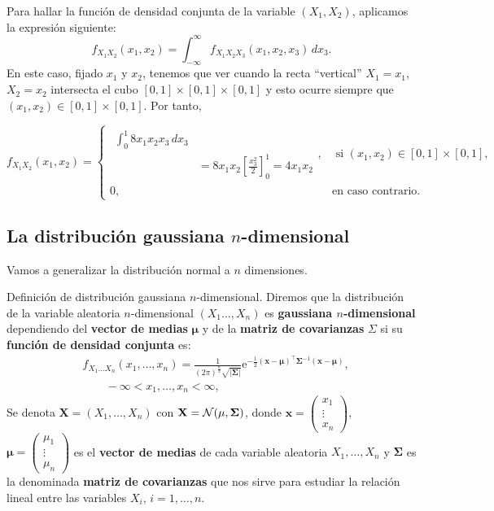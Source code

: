 \documentclass[]{book}
\begin{document}
Para hallar la función de densidad conjunta de la variable \((X_1,X_2)\), aplicamos la expresión siguiente:
\[
f_{X_1X_2}(x_1,x_2)=\int_{-\infty}^\infty  f_{X_1X_2X_3}(x_1,x_2,x_3)\, dx_3.
\]
En este caso, fijado \(x_1\) y \(x_2\), tenemos que ver cuando la recta ``vertical'' \(X_1=x_1\), \(X_2=x_2\) intersecta el cubo \([0,1]\times [0,1]\times [0,1]\) y esto ocurre siempre que \((x_1,x_2)\in [0,1]\times [0,1]\).
Por tanto,

\[
f_{X_1X_2}(x_1,x_2)=\begin{cases}
\begin{array}{rl}
\int_{0}^1 8 x_1x_2 x_3  \, dx_3\\ & =8x_1x_2 
\left[\frac{x_3^2}{2}\right]_0^1 =4 x_1 x_2\end{array},
& \mbox{ si }(x_1,x_2)\in [0,1]\times [0,1],\\
0, & \mbox{en caso contrario.}
\end{cases}
\]

\hypertarget{la-distribuciuxf3n-gaussiana-n-dimensional}{%
\subsection{\texorpdfstring{La distribución gaussiana \(n\)-dimensional}{La distribución gaussiana n-dimensional}}\label{la-distribuciuxf3n-gaussiana-n-dimensional}}

Vamos a generalizar la distribución normal a \(n\) dimensiones.

Definición de distribución gaussiana \(n\)-dimensional.
Diremos que la distribución de la variable aleatoria \(n\)-dimensional \((X_1\ldots,X_n)\) es \textbf{gaussiana \(n\)-dimensional} dependiendo del \textbf{vector de medias} \(\mathbf{\mu}\) y de la \textbf{matriz de covarianzas} \(\Sigma\) si su \textbf{función de densidad conjunta} es:
\[
\begin{array}{rl}
& f_{X_1\ldots X_n}(x_1,\ldots,x_n)=\frac{1}{(2\pi)^{\frac{n}{2}}\sqrt{\mathbf{|\Sigma|}}}\mathrm{e}^{-\frac{1}{2}(\mathbf{x-\mu})^\top\mathbf{\Sigma}^{-1}(\mathbf{x-\mu})},\\ & \qquad  -\infty <x_1,\ldots,x_n<\infty,
\end{array}
\]
Se denota \(\mathbf{X}=(X_1,\ldots,X_n)\) con \(\mathbf{X}={\cal N}(\mathbf{\mu},\mathbf{\Sigma})\), donde \(\mathbf{x}=\begin{pmatrix}x_1\\\vdots\\ x_n\end{pmatrix}\), \(\mathbf{\mu}=\begin{pmatrix}\mu_1\\\vdots\\ \mu_n\end{pmatrix}\) es el \textbf{vector de medias} de cada variable aleatoria \(X_1,\ldots, X_n\) y \(\mathbf{\Sigma}\) es la denominada \textbf{matriz de covarianzas} que nos sirve para estudiar la relación lineal entre las variables \(X_i\), \(i=1,\ldots, n\).
\end{document}

